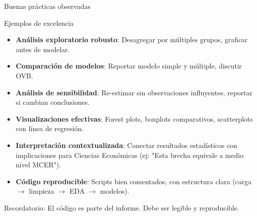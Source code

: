 \documentclass[aspectratio=169, 11pt]{beamer}
\begin{document}
\begin{frame}{Buenas prácticas observadas}
\begin{exampleblock}{Ejemplos de excelencia}
\begin{itemize}
\item \textbf{Análisis exploratorio robusto}: Desagregar por múltiples grupos, graficar antes de modelar.

\item \textbf{Comparación de modelos}: Reportar modelo simple y múltiple, discutir OVB.

\item \textbf{Análisis de sensibilidad}: Re-estimar sin observaciones influyentes, reportar si cambian conclusiones.

\item \textbf{Visualizaciones efectivas}: Forest plots, boxplots comparativos, scatterplots con línea de regresión.

\item \textbf{Interpretación contextualizada}: Conectar resultados estadísticos con implicaciones para Ciencias Econ\'omicas (ej: "Esta brecha equivale a medio nivel MCER").

\item \textbf{Código reproducible}: Scripts bien comentados, con estructura clara (carga $\to$ limpieza $\to$ EDA $\to$ modelos).
\end{itemize}
\end{exampleblock}

\footnotesize
\textcolor{javeriana}{Recordatorio}: El c\'odigo es parte del informe. Debe ser legible y reproducible.
\end{frame}
\end{document}
